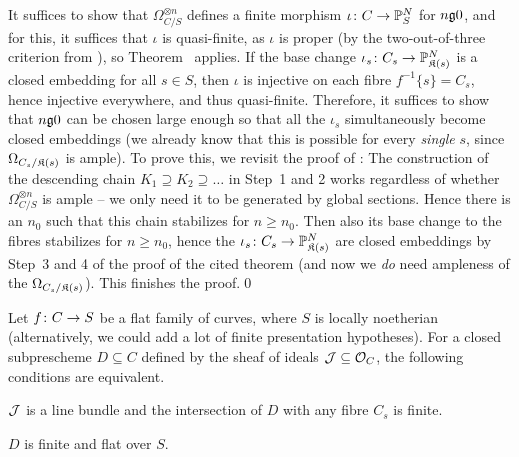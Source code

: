 \documentclass[a4paper,parskip=half,numbers=enddot, DIV=12]{scrreprt}
\renewcommand{\geq}{\geqslant}
\begin{document}
\begin{rem}
	It suffices to show that $\Omega_{C/S}^{\otimes n}$ defines a finite morphism $\iota\colon C\morphism\IP_S^N$ for $n\gge 0$, and for this, it suffices that $\iota$ is quasi-finite, as $\iota$ is proper (by the two-out-of-three criterion from \cite[Proposition~2.4.1]{alggeo2}), so Theorem~ applies. If the base change $\iota_s\colon C_s\morphism\IP_{\KK(s)}^N$ is a closed embedding for all $s\in S$, then $\iota$ is injective on each fibre $f^{-1}\{s\}= C_s$, hence injective everywhere, and thus quasi-finite. Therefore, it suffices to show that $n\gge 0$ can be chosen large enough so that all the $\iota_s$ simultaneously become closed embeddings (we already know that this is possible for every \emph{single} $s$, since $\Omega_{C_s/\mathfrak{K}(s)}$ is ample). To prove this, we revisit the proof of \cite[Theorem~6]{alggeo2}: The construction of the descending chain $K_1\supseteq K_2\supseteq\ldots$ in Step~1 and 2 works regardless of whether $\Omega_{C/S}^{\otimes n}$ is ample -- we only need it to be generated by global sections. Hence there is an $n_0$ such that this chain stabilizes for $n\geq n_0$. Then also its base change to the fibres stabilizes for $n\geq n_0$, hence the $\iota_s\colon C_s\morphism\IP_{\KK(s)}^N$ are closed embeddings by Step~3 and 4 of the proof of the cited theorem (and now we \emph{do} need ampleness of the $\Omega_{C_s/\mathfrak{K}(s)}$). This finishes the proof.\qed
\end{rem}
\begin{lem}
	Let $f\colon C\morphism S$ be a flat family of curves, where $S$ is locally noetherian (alternatively, we could add a lot of finite presentation hypotheses). For a closed subprescheme $D\subseteq C$ defined by the sheaf of ideals $\mathcal{J}\subseteq \mathcal{O}_C$, the following conditions are equivalent.
	\begin{alphanumerate}
		\item $\mathcal{J}$ is a line bundle and the intersection of $D$ with any fibre $C_s$ is finite.
		\item $D$ is finite and flat over $S$.
	\end{alphanumerate}
\end{lem}
\end{document}
